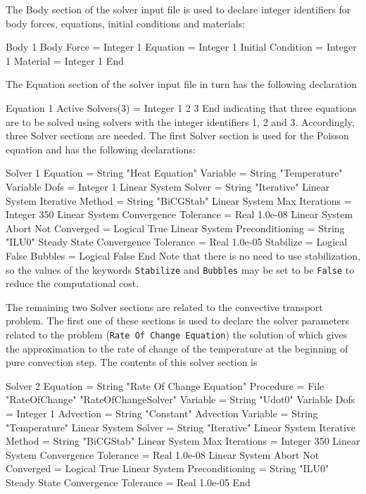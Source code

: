 The Body section of the solver input file is used to declare integer 
identifiers for body forces, equations, initial conditions and materials: 

\ttbegin
Body 1
  Body Force = Integer 1
  Equation = Integer 1
  Initial Condition = Integer 1
  Material = Integer 1
End
\ttend

The Equation section of the solver input file in turn has the following 
declaration

\ttbegin
Equation 1
  Active Solvers(3) = Integer 1 2 3
End
\ttend
indicating that three equations are to be solved using solvers with 
the integer identifiers 1, 2 and 3.   
Accordingly, three Solver sections are needed.  
The first Solver section is used for the Poisson equation and has the 
following declarations:

\ttbegin
Solver 1
  Equation = String "Heat Equation"
  Variable = String "Temperature"
  Variable Dofs = Integer 1
  Linear System Solver = String "Iterative"
  Linear System Iterative Method = String "BiCGStab"
  Linear System Max Iterations = Integer 350
  Linear System Convergence Tolerance = Real 1.0e-08
  Linear System Abort Not Converged = Logical True
  Linear System Preconditioning = String "ILU0"
  Steady State Convergence Tolerance = Real 1.0e-05
  Stabilize = Logical False
  Bubbles = Logical False
End
\ttend
Note that there is no need to use stabilization, so the values of the keywords 
{\tt Stabilize} and {\tt Bubbles} may be set to be {\tt False} to reduce the
computational cost. 

The remaining two Solver sections are related to the convective transport
problem. The first one of these sections is used to declare the solver
parameters related to the problem ({\tt Rate Of Change Equation}) the 
solution of which gives the approximation to the rate of change of the 
temperature at the beginning of pure convection step. The contents
of this solver section is 

\ttbegin
Solver 2
  Equation = String "Rate Of Change Equation"
  Procedure = File "RateOfChange" "RateOfChangeSolver"
  Variable = String "Udot0"
  Variable Dofs = Integer 1   
  Advection = String "Constant"
  Advection Variable = String "Temperature" 
  Linear System Solver = String "Iterative"
  Linear System Iterative Method = String "BiCGStab"
  Linear System Max Iterations = Integer 350
  Linear System Convergence Tolerance = Real 1.0e-08
  Linear System Abort Not Converged = Logical True
  Linear System Preconditioning = String "ILU0"
  Steady State Convergence Tolerance = Real 1.0e-05
End
\ttend

